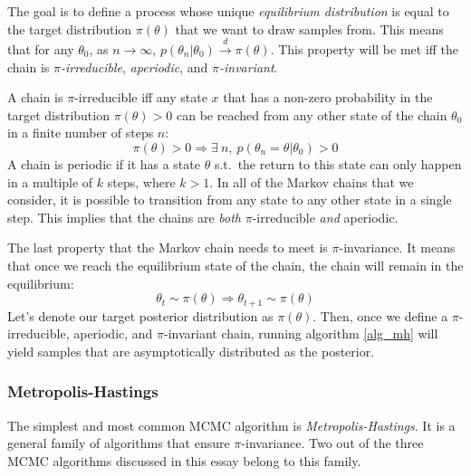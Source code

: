 \documentclass[12pt]{article}
\begin{document}
The goal is to define a process whose unique \textit{equilibrium distribution} is equal to the target distribution $\pi(\theta)$ that we want to draw samples from. This means that for any $\theta_0$, as $n \rightarrow \infty$, $p(\theta_n|\theta_0) \xrightarrow{d} \pi(\theta)$. This property will be met iff the chain is \textit{$\pi$-irreducible}, \textit{aperiodic}, and \textit{$\pi$-invariant}.

A chain is $\pi$-irreducible iff any state $x$ that has a non-zero probability in the target distribution $\pi(\theta) > 0$ can be reached from any other state of the chain $\theta_0$ in a finite number of steps $n$:
\begin{equation}
\pi(\theta) > 0 \Rightarrow \exists \ n, \ p(\theta_n = \theta|\theta_0) > 0
\end{equation}
A chain is periodic if it has a state $\theta$ s.t.\ the return to this state can only happen in a multiple of $k$ steps, where $k > 1$. In all of the Markov chains that we consider, it is possible to transition from any state to any other state in a single step. This implies that the chains are \textit{both} $\pi$-irreducible \textit{and} aperiodic.

The last property that the Markov chain needs to meet is $\pi$-invariance. It means that once we reach the equilibrium state of the chain, the chain will remain in the equilibrium:
\begin{equation}
\theta_t \sim \pi(\theta) \Rightarrow \theta_{t+1} \sim \pi(\theta)
\end{equation}
Let's denote our target posterior distribution as $\pi(\theta)$. Then, once we define a $\pi$-irreducible, aperiodic, and $\pi$-invariant chain, running algorithm \ref{alg_mh} will yield samples that are asymptotically distributed as the posterior.

\subsubsection{Metropolis-Hastings}

The simplest and most common MCMC algorithm is \textit{Metropolis-Hastings}. It is a general family of algorithms that ensure $\pi$-invariance. Two out of the three MCMC algorithms discussed in this essay belong to this family.
\end{document}
